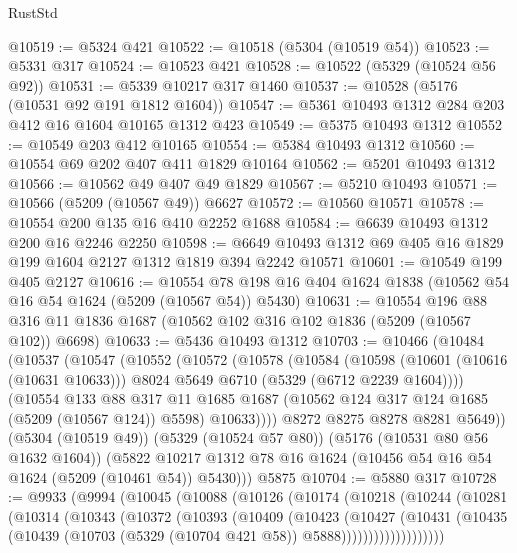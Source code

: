 \begin{lexlean}{RustStd}
\begin{coremodule}
@10519 := @5324 @421
@10522 := @10518 (@5304 (@10519 @54))
@10523 := @5331 @317
@10524 := @10523 @421
@10528 := @10522 (@5329 (@10524 @56 @92))
@10531 := @5339 @10217 @317 @1460
@10537 := @10528 (@5176 (@10531 @92 @191 @1812 @1604))
@10547 := @5361 @10493 @1312 @284 @203 @412 @16 @1604 @10165 @1312 @423
@10549 := @5375 @10493 @1312
@10552 := @10549 @203 @412 @10165
@10554 := @5384 @10493 @1312
@10560 := @10554 @69 @202 @407 @411 @1829 @10164
@10562 := @5201 @10493 @1312
@10566 := @10562 @49 @407 @49 @1829
@10567 := @5210 @10493
@10571 := @10566 (@5209 (@10567 @49)) @6627
@10572 := @10560 @10571
@10578 := @10554 @200 @135 @16 @410 @2252 @1688
@10584 := @6639 @10493 @1312 @200 @16 @2246 @2250
@10598 := @6649 @10493 @1312 @69 @405 @16 @1829 @199 @1604 @2127 @1312 @1819 @394 @2242 @10571
@10601 := @10549 @199 @405 @2127
@10616 := @10554 @78 @198 @16 @404 @1624 @1838 (@10562 @54 @16 @54 @1624 (@5209 (@10567 @54)) @5430)
@10631 := @10554
    @196
    @88
    @316
    @11
    @1836
    @1687
    (@10562 @102 @316 @102 @1836 (@5209 (@10567 @102)) @6698)
@10633 := @5436 @10493 @1312
@10703 := @10466
    (@10484
      (@10537
        (@10547
          (@10552
            (@10572
              (@10578
                (@10584
                  (@10598
                    (@10601 (@10616 (@10631 @10633)))
                    @8024
                    @5649
                    @6710
                    (@5329 (@6712 @2239 @1604))))
                (@10554
                  @133
                  @88
                  @317
                  @11
                  @1685
                  @1687
                  (@10562 @124 @317 @124 @1685 (@5209 (@10567 @124)) @5598)
                  @10633))))
          @8272
          @8275
          @8278
          @8281
          @5649))
      (@5304 (@10519 @49))
      (@5329 (@10524 @57 @80))
      (@5176 (@10531 @80 @56 @1632 @1604))
      (@5822 @10217 @1312 @78 @16 @1624 (@10456 @54 @16 @54 @1624 (@5209 (@10461 @54)) @5430)))
    @5875
@10704 := @5880 @317
@10728 := @9933
    (@9994
      (@10045
        (@10088
          (@10126
            (@10174
              (@10218
                (@10244
                  (@10281
                    (@10314
                      (@10343
                        (@10372
                          (@10393
                            (@10409
                              (@10423
                                (@10427
                                  (@10431
                                    (@10435
                                      (@10439
                                        (@10703 (@5329 (@10704 @421 @58)) @5888)))))))))))))))))))

\end{coremodule}
\end{lexlean}
